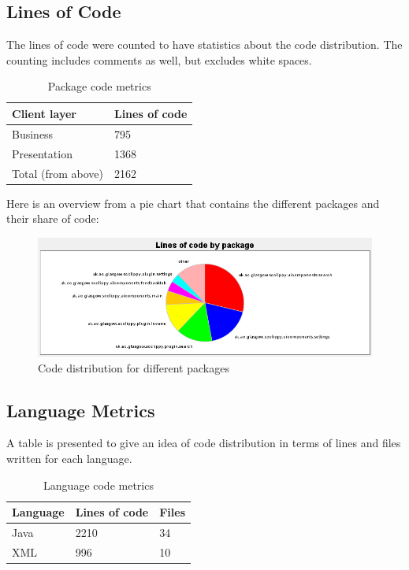 \documentclass{l4proj}
\begin{document}
\subsection{Lines of Code}
The lines of code were counted to have statistics about the code distribution. The counting includes comments as well, but excludes white spaces.

\begin{table}[H]
\small
\caption{Package code metrics}
\centering
\def\arraystretch{1.5}
\begin{tabular}{p{3cm}p{3cm}}
\hline
Client layer & Lines of code\\
\hline
Business & 795\\
Presentation & 1368\\
\hline
Total (from above) & 2162\\
\hline
\end{tabular}
\label{table:package-codemetrics}
\end{table}

Here is an overview from a pie chart that contains the different packages and their share of code:

\begin{figure}[H]
\includegraphics[scale=0.6]{code-distribution}
\centering
\caption{Code distribution for different packages}
\label{fig:code-distribution}
\end{figure}

\subsection{Language Metrics}
A table is presented to give an idea of code distribution in terms of lines and files written for each language.

\begin{table}[H]
\small
\caption{Language code metrics}
\centering
\def\arraystretch{1.5}
\begin{tabular}{p{2.5cm}p{2.5cm}p{2.5cm}}
\hline
Language & Lines of code & Files\\
\hline
Java & 2210 & 34\\
XML & 996 & 10\\
\hline
\end{tabular}
\label{table:language-codemetrics}
\end{table}
\end{document}

